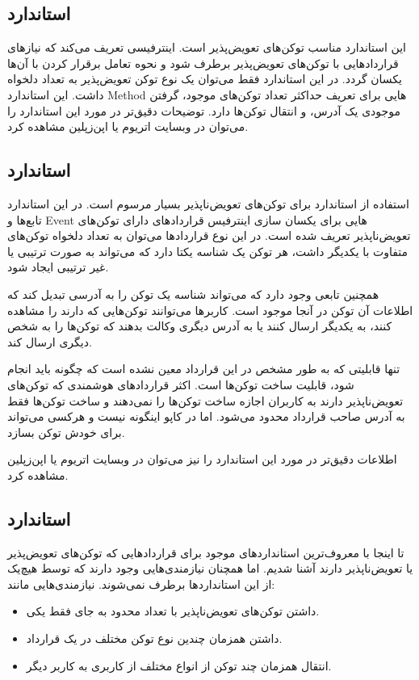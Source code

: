 \subsection{استاندارد }
این استاندارد مناسب توکن‌های تعویض‌پذیر است.
اینترفیسی تعریف می‌کند که نیازهای قراردادهایی با توکن‌های تعویض‌پذیر برطرف شود
و نحوه تعامل برقرار کردن با آن‌ها یکسان گردد.
در این استاندارد فقط می‌توان یک نوع توکن تعویض‌پذیر به تعداد دلخواه داشت.
این استاندارد
\gls{Method}
هایی برای تعریف حداکثر تعداد توکن‌های موجود،
گرفتن موجودی یک آدرس، و انتقال توکن‌ها دارد. توضیحات دقیق‌تر در مورد این استاندارد را می‌توان در وبسایت
اتریوم
یا اپن‌زپلین
مشاهده کرد.

\subsection{استاندارد }
استفاده از استاندارد
برای توکن‌های تعویض‌ناپذیر بسیار مرسوم است.
در این استاندارد تابع‌ها و
\gls{Event}
هایی برای یکسان سازی اینترفیس قراردادهای دارای توکن‌های تعویض‌ناپذیر تعریف شده است.
در این نوع قرارداد‌ها می‌توان به تعداد دلخواه توکن‌های متفاوت با یکدیگر داشت،
هر توکن یک شناسه یکتا دارد که می‌تواند به صورت ترتیبی یا غیر ترتیبی ایجاد شود.

همچنین تابعی وجود دارد که می‌تواند شناسه یک توکن را به آدرسی تبدیل کند که اطلاعات آن توکن در آنجا موجود است.
کاربرها می‌توانند توکن‌هایی که دارند را مشاهده کنند،
به یکدیگر ارسال کنند یا به آدرس دیگری وکالت بدهند که توکن‌ها را به شخص دیگری ارسال کند.

تنها قابلیتی که به طور مشخص در این قرارداد معین نشده است که چگونه باید انجام شود،
قابلیت ساخت توکن‌ها است.
اکثر قراردادهای هوشمندی که توکن‌های تعویض‌ناپذیر دارند به کاربران اجازه ساخت توکن‌ها را نمی‌دهند
و ساخت توکن‌ها فقط به آدرس صاحب قرارداد محدود می‌شود.
اما در کاپو اینگونه نیست و هرکسی می‌تواند برای خودش توکن بسازد.

اطلاعات دقیق‌تر در مورد این استاندارد را نیز می‌توان در وبسایت
اتریوم
یا
اپن‌زپلین
مشاهده کرد.


\subsection{استاندارد }
تا اینجا با معروف‌ترین استاندارد‌های موجود برای قراردادهایی که توکن‌های تعویض‌پذیر یا تعویض‌ناپذیر دارند آشنا شدیم.
اما همچنان نیازمندی‌هایی وجود دارند که توسط هیچ‌یک از این استانداردها برطرف نمی‌شوند. نیازمندی‌هایی مانند:
\begin{itemize}
	\item
داشتن توکن‌های تعویض‌ناپذیر با تعداد محدود به جای فقط یکی.
	\item
داشتن همزمان چندین نوع توکن مختلف در یک قرارداد.
	\item
انتقال همزمان چند توکن از انواع مختلف از کاربری به کاربر دیگر.
\end{itemize}

